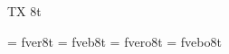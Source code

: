 
\ifx\ffdecl\undefined  \fi

\ffdecl [Bera] {\sans} {\rm \bf \it \bi} {} {TX} {8t}

\def\sans{\ffsetV{sans}{s}\ffsetX}    \def\nosans{\ffsetV{sans}{e}\ffsetX}
\def\sansV{e} 

\ismacro{}\ifttrue

   \font\tenrm = fver8t  \sizespec
   \font\tenbf = fveb8t  \sizespec
   \font\tenit = fvero8t \sizespec
   \font\tenbi = fvebo8t \sizespec

   \def\ffnamegen{fv\sansV \ffvarV 8t}

\fi
\tenrm %

\def\sserif{\sans\fam}

\ifx\loadmathfonts\relax \endinput \fi
\ifx\mathpreloaded X\else  \fi                     

\endinput
